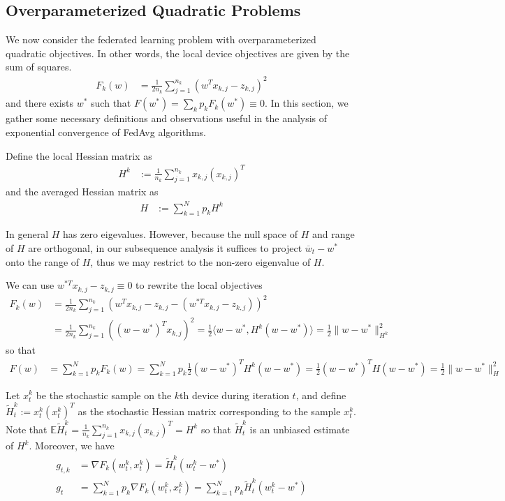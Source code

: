 \subsection{Overparameterized Quadratic Problems}

We now consider the federated learning problem with overparameterized
quadratic objectives. In other words, the local device objectives
are given by the sum of squares. 
\begin{align*}
F_{k}(w) & =\frac{1}{2n_{k}}\sum_{j=1}^{n_{k}}(w^{T}x_{k,j}-z_{k,j})^{2}
\end{align*}
and there exists $w^{\ast}$ such that $F(w^{\ast})=\sum_{k}p_{k}F_{k}(w^{\ast})\equiv0$.
In this section, we gather some necessary definitions and observations
useful in the analysis of exponential convergence of FedAvg algorithms. 

Define the local Hessian matrix as 
\begin{align*}
H^{k} & :=\frac{1}{n_{k}}\sum_{j=1}^{n_{k}}x_{k,j}(x_{k,j})^{T}
\end{align*}
and the averaged Hessian matrix as 
\begin{align*}
H & :=\sum_{k=1}^{N}p_{k}H^{k}
\end{align*}

In general $H$ has zero eigevalues. However, because the null space
of $H$ and range of $H$ are orthogonal, in our subsequence analysis
it suffices to project $\overline{w}_{t}-w^{\ast}$ onto the range
of $H$, thus we may restrict to the non-zero eigenvalue of $H$. 

We can use $w^{\ast T}x_{k,j}-z_{k,j}\equiv0$ to rewrite the local
objectives 
\begin{align*}
F_{k}(w) & =\frac{1}{2n_{k}}\sum_{j=1}^{n_{k}}(w^{T}x_{k,j}-z_{k,j}-(w^{\ast T}x_{k,j}-z_{k,j}))^{2}\\
& =\frac{1}{2n_{k}}\sum_{j=1}^{n_{k}}((w-w^{\ast})^{T}x_{k,j})^{2}=\frac{1}{2}\langle w-w^{\ast},H^{k}(w-w^{\ast})\rangle=\frac{1}{2}\|w-w^{\ast}\|_{H^{k}}^{2}
\end{align*}
so that 
\begin{align*}
F(w) & =\sum_{k=1}^{N}p_{k}F_{k}(w)=\sum_{k=1}^{N}p_{k}\frac{1}{2}(w-w^{\ast})^{T}H^{k}(w-w^{\ast})=\frac{1}{2}(w-w^{\ast})^{T}H(w-w^{\ast})=\frac{1}{2}\|w-w^{\ast}\|_{H}^{2}
\end{align*}

Let $x_{t}^{k}$ be the stochastic sample on the $k$th device during
iteration $t$, and define $\tilde{H}_{t}^{k}:=x_{t}^{k}(x_{t}^{k})^{T}$
as the stochastic Hessian matrix corresponding to the sample $x_{t}^{k}$.
Note that $\mathbb{E}\tilde{H}_{t}^{k}=\frac{1}{n_{k}}\sum_{j=1}^{n_{k}}x_{k,j}(x_{k,j})^{T}=H^{k}$
so that $\tilde{H}_{t}^{k}$ is an unbiased estimate of $H^{k}$.
Moreover, we have
\begin{align*}
g_{t,k} & =\nabla F_{k}(w_{t}^{k},x_{t}^{k})=\tilde{H}_{t}^{k}(w_{t}^{k}-w^{\ast})\\
g_{t} & =\sum_{k=1}^{N}p_{k}\nabla F_{k}(w_{t}^{k},x_{t}^{k})=\sum_{k=1}^{N}p_{k}\tilde{H}_{t}^{k}(w_{t}^{k}-w^{\ast})
\end{align*}

